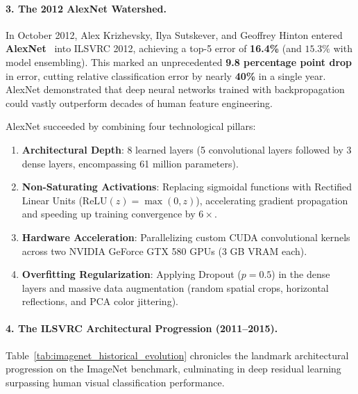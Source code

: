 \paragraph{3. The 2012 AlexNet Watershed.}
In October 2012, Alex Krizhevsky, Ilya Sutskever, and Geoffrey Hinton entered \textbf{AlexNet}~\cite{krizhevsky2012imagenet} into ILSVRC 2012, achieving a top-5 error of \textbf{16.4\%} (and $15.3\%$ with model ensembling).
This marked an unprecedented \textbf{9.8 percentage point drop} in error, cutting relative classification error by nearly \textbf{40\%} in a single year. AlexNet demonstrated that deep neural networks trained with backpropagation could vastly outperform decades of human feature engineering.

AlexNet succeeded by combining four technological pillars:
\begin{enumerate}[noitemsep]
  \item \textbf{Architectural Depth}: 8 learned layers (5 convolutional layers followed by 3 dense layers, encompassing 61 million parameters).
  \item \textbf{Non-Saturating Activations}: Replacing sigmoidal functions with Rectified Linear Units ($\text{ReLU}(z) = \max(0, z)$), accelerating gradient propagation and speeding up training convergence by $6\times$.
  \item \textbf{Hardware Acceleration}: Parallelizing custom CUDA convolutional kernels across two NVIDIA GeForce GTX 580 GPUs (3 GB VRAM each).
  \item \textbf{Overfitting Regularization}: Applying Dropout ($p=0.5$) in the dense layers and massive data augmentation (random spatial crops, horizontal reflections, and PCA color jittering).
\end{enumerate}

\paragraph{4. The ILSVRC Architectural Progression (2011--2015).}
Table~\ref{tab:imagenet_historical_evolution} chronicles the landmark architectural progression on the ImageNet benchmark, culminating in deep residual learning surpassing human visual classification performance.

